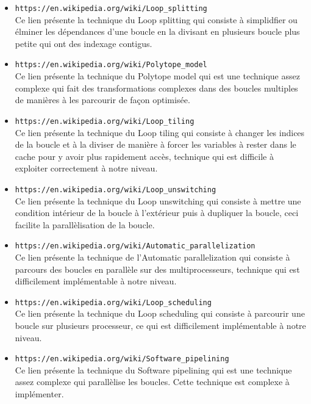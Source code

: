 \documentclass[a4paper]{article}
\begin{document}
\begin{itemize}
\item \texttt{https://en.wikipedia.org/wiki/Loop\_splitting} \\
Ce lien présente la technique du Loop splitting qui consiste à simplidfier ou élminer les dépendances d'une boucle en la divisant en plusieurs boucle plus petite qui ont des indexage contigus.\\

\item \texttt{https://en.wikipedia.org/wiki/Polytope\_model} \\
Ce lien présente la technique du Polytope model qui est une technique assez complexe qui fait des transformations complexes dans des boucles multiples de manières à les parcourir de façon optimisée.\\

\item \texttt{https://en.wikipedia.org/wiki/Loop\_tiling} \\
Ce lien présente la technique du Loop tiling qui consiste à changer les indices de la boucle et à la diviser de manière à forcer les variables à rester dans le cache pour y avoir plus rapidement accès, technique qui est difficile à exploiter correctement à notre niveau.\\

\item \texttt{https://en.wikipedia.org/wiki/Loop\_unswitching} \\
Ce lien présente la technique du Loop unswitching qui consiste à mettre une condition intérieur de la boucle à l'extérieur puis à dupliquer la boucle, ceci facilite la parallèlisation de la boucle.\\

\item \texttt{https://en.wikipedia.org/wiki/Automatic\_parallelization} \\
Ce lien présente la technique de l'Automatic parallelization qui consiste à parcours des boucles en parallèle sur des multiprocesseurs, technique qui est difficilement implémentable à notre niveau.

\item \texttt{https://en.wikipedia.org/wiki/Loop\_scheduling} \\
Ce lien présente la technique du Loop scheduling qui consiste à parcourir une boucle sur plusieurs processeur, ce qui est difficilement implémentable à notre niveau.\\

\item \texttt{https://en.wikipedia.org/wiki/Software\_pipelining} \\
Ce lien présente la technique du Software pipelining qui est une technique assez complexe qui parallèlise les boucles. Cette technique est complexe à implémenter.


\end{itemize}
\end{document}
